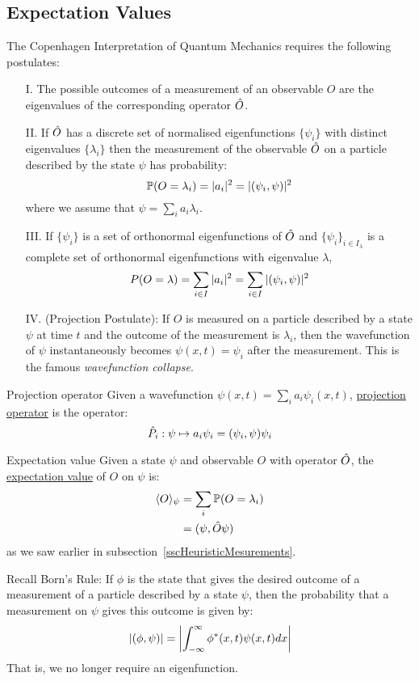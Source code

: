 \documentclass[../Main.tex]{subfiles}
\begin{document}
\subsection{Expectation Values}
The Copenhagen Interpretation of Quantum Mechanics requires the following postulates:
\begin{enumerate}
    \item[I.] The possible outcomes of a measurement of an observable $O$ are the eigenvalues of the corresponding operator $\hat{O}$.
    \item[II.] If $\hat{O}$ has a discrete set of normalised eigenfunctions $\{\psi_i\}$ with distinct eigenvalues $\{\lambda_i\}$ then the measurement of the observable $\hat{O}$ on a particle described by the state $\psi$ has probability:
        \begin{equation*}
            \mathbb{P}(O = \lambda_i) = |a_i|^2 = |(\psi_i,\psi)|^2
        \end{equation*}
        where we assume that $\psi = \sum_i a_i \lambda_i$.
    \item[III.] If $\{\psi_i\}$ is a set of orthonormal eigenfunctions of $\hat{O}$ and $\{\psi_i\}_{i \in I_\lambda}$ is a complete set of orthonormal eigenfunctions with eigenvalue $\lambda$,
        \begin{equation*}
            P(O = \lambda) = \sum_{i \in I} |a_i|^2 = \sum_{i \in I} |(\psi_i,\psi)|^2
        \end{equation*}
    \item[IV.] (Projection Postulate): If $O$ is measured on a particle described by a state $\psi$ at time $t$ and the outcome of the measurement is $\lambda_i$, then the wavefunction of $\psi$ instantaneously becomes $\psi(x, t) = \psi_i$ after the measurement. This is the famous \textit{wavefunction collapse}.
\end{enumerate}
\begin{definition}{Projection operator}
    Given a wavefunction $\psi(x, t) = \sum_i a_i \psi_i(x,t)$, \underline{projection operator} is the operator:
    \begin{equation*}
        \hat{P}_i : \psi \mapsto a_i \psi_i = (\psi_i,\psi) \psi_i
    \end{equation*}
\end{definition}
\begin{definition}{Expectation value}
    Given a state $\psi$ and observable $O$ with operator $\hat{O}$, the \underline{expectation value} of $O$ on $\psi$ is:
    \begin{align*}
        \langle O \rangle_\psi &= \sum_i \mathbb{P}(O = \lambda_i) \\
        &= (\psi,\hat{O}\psi)
    \end{align*}
    as we saw earlier in subsection~\ref{sscHeuristicMesurements}.
\end{definition}
Recall Born's Rule: If $\phi$ is the state that gives the desired outcome of a measurement of a particle described by a state $\psi$, then the probability that a measurement on $\psi$ gives this outcome is given by:
\begin{equation*}
    |(\phi,\psi)| = \left|\int_{-\infty}^{\infty} \phi^*(x, t) \psi(x, t) dx \right|
\end{equation*}
That is, we no longer require an eigenfunction.
\end{document}
